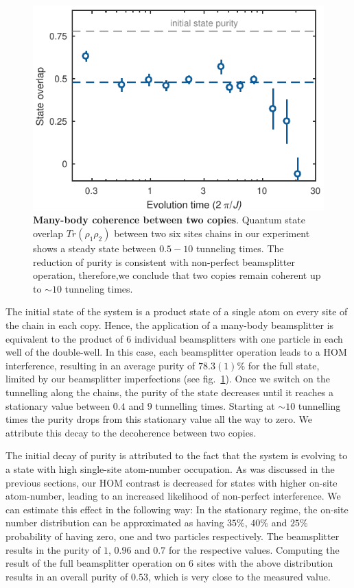 \begin{figure}[t]
	\centering
	\includegraphics[scale=1]{figures/CBH_MBP_single_trace.pdf}
	\caption{{\bf Many-body coherence between two copies}. Quantum state overlap $Tr(\rho_1 \rho_2) $ between two six sites chains in our experiment shows a steady state between $0.5-10$ tunneling times. The reduction of purity is consistent with non-perfect beamsplitter operation, therefore,we conclude that two copies remain coherent up to $\sim10$ tunneling times. }
	\label{fig:CBH_MBP_vs_time}
\end{figure}
\label{bs_imperfactions}
The initial state of the system is a product state of a single atom on every site of the chain in each copy. Hence, the application of a many-body beamsplitter is equivalent to the product of $6$ individual beamsplitters with one particle in each well of the double-well. In this case, each beamsplitter operation leads to a HOM interference, resulting in an average purity of $78.3(1)\%$ for the full state, limited by our beamsplitter imperfections (see fig.~\ref{fig:CBH_MBP_vs_time}). Once we switch on the tunnelling along the chains, the purity of the state decreases until it reaches a stationary value between $0.4$ and $ 9$ tunnelling times. Starting at $\sim 10$ tunnelling times the purity drops from this stationary value all the way to zero. We attribute this decay to the decoherence between two copies.

The initial decay of purity is attributed to the fact that the system is evolving to a state with high single-site atom-number occupation. As was discussed in the previous sections, our HOM contrast is decreased for states with higher on-site atom-number, leading to an increased likelihood of non-perfect interference. We can estimate this effect in the following way: In the stationary regime, the on-site number distribution can be approximated as having $35\%$, $40\%$ and $25\%$ probability of having zero, one and two particles respectively. The beamsplitter results in the purity of $1$, $0.96$ and $0.7$ for the respective values. Computing the result of the full beamsplitter operation on $6$ sites with the above distribution results in an overall purity of $0.53$, which is very close to the measured value.

